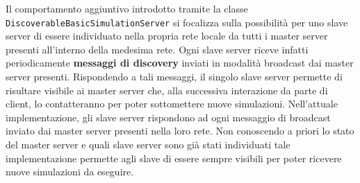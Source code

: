 Il comportamento aggiuntivo introdotto tramite la classe \texttt{DiscoverableBasicSimulationServer} si focalizza sulla possibilità per uno slave server di essere individuato nella propria rete locale da tutti i master server
presenti all'interno della medesima rete. Ogni slave server riceve infatti periodicamente \textbf{messaggi di discovery} inviati in modalità broadcast dai master server presenti. Rispondendo a tali messaggi, il singolo slave server
permette di risultare visibile ai master server che, alla successiva interazione da parte di client, lo contatteranno per poter sottomettere nuove simulazioni.
Nell'attuale implementazione, gli slave server rispondono ad ogni messaggio di broadcast inviato dai master server presenti nella loro rete. Non conoscendo a priori lo stato del master server e quali slave server sono già stati individuati
tale implementazione permette agli slave di essere sempre visibili per poter ricevere nuove simulazioni da eseguire.